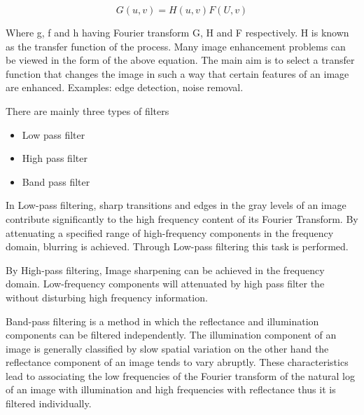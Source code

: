 \begin{equation}
	G (u, v) = H (u, v) F (U, v)
\end{equation}


Where g, f and h having Fourier transform G, H and F respectively. H is known as the transfer function of the process. Many image enhancement problems can be viewed in the form of the above equation. The main aim is to select a transfer function that changes the image in such a way that certain features of an image are enhanced. Examples: edge detection, noise removal.

There are mainly three types of filters
\begin{itemize}
	\item Low pass filter
	\item High pass filter
	\item Band pass filter

\end{itemize}

In Low-pass filtering, sharp transitions and edges in the gray levels of an image contribute significantly to the high frequency content of its Fourier Transform. By attenuating a specified range of high-frequency components in the frequency domain, blurring is achieved. Through Low-pass filtering this task is performed.

By High-pass filtering, Image sharpening can be achieved in the frequency domain. Low-frequency components will attenuated by high pass filter the without disturbing high frequency information.

Band-pass filtering is a method in which the reflectance and illumination components can be filtered independently. The illumination component of an image is generally classified by slow spatial variation on the other hand the reflectance component of an image tends to vary abruptly. These characteristics lead to associating the low frequencies of the Fourier transform of the natural log of an image with illumination and high frequencies with reflectance thus it is filtered individually.

